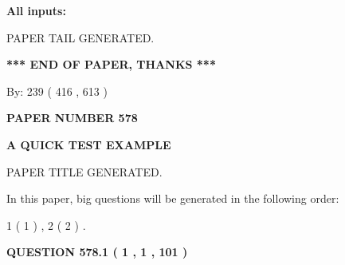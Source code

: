 \documentclass[12pt]{article}
\begin{document}
   
   
   
\noindent{}
   
   
   
   
\noindent\vspace{0.1in}\hspace{-0.08in} {\textbf{\Large{All inputs: }}}
   
   
   
   
   
   
 \vspace{0.2in}
 
   
   
\vspace{2.0in} PAPER TAIL GENERATED.
   
   
   
   
\vspace{1.0in} 
{\textbf{\large{ *** END OF PAPER, THANKS *** }}} 
   
   
\hspace{1.0in} By: 
 239 ( 416 ,  613 )
   
   
   
   
\newpage 
\setcounter{page}{ 
   578001 } 
   
   
   
   
 {\textbf{ \Large{ PAPER NUMBER  578  }}}
   
   
\vspace{0.2in}
   
   
   
   
   
   
   
   
 \vspace{0.2in}
{\LARGE {\textbf{ A QUICK TEST EXAMPLE}}}
   
   
 PAPER TITLE GENERATED.
   
   
   
\vspace{0.2in}
   
In this paper, big questions will be generated in the following order: 
   
   
   1 ( 1 )
 ,
   2 ( 2 )
 .
  
\vspace{0.2in}
  
{\textbf{\Large{QUESTION
578.1 
 ( 1 , 1 , 101 )
}}}
  
  
 
\end{document}
